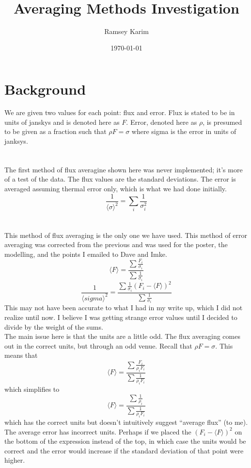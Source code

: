 \documentclass{article}
\title{Averaging Methods Investigation}
\author{Ramsey Karim}
\date{\today}
\newcommand{\av}[1]{\langle #1 \rangle}
\begin{document}
\maketitle

\section*{Background}
We are given two values for each point: flux and error.
Flux is stated to be in units of janskys and is denoted here as $F$.
Error, denoted here as $\rho$, is presumed to be given as a fraction such that
$\rho F = \sigma$ where sigma is the error in units of janksys.

\section{} \label{s:1}
The first method of flux averagine shown here was never implemented;
it's more of a test of the data.
The flux values are the standard deviations.
The error is averaged assuming thermal error only, which is what we had done initially.
$$ \frac{1}{\av{\sigma}^{2}} = \sum_{i} \frac{1}{\sigma_{i}^{2}} $$

\section{} \label{s:2}
This method of flux averaging is the only one we have used.
This method of error averaging was corrected from the previous and was used
for the poster, the modelling, and the points I emailed to Dave and Imke.
$$ \av{F} = \frac{\sum \frac{F_{i}}{\sigma_{i}}}{\sum \frac{1}{\sigma_{i}}} $$
$$ \frac{1}{\av{sigma}^{2}} =  \frac{\sum \frac{1}{\sigma_{i}} (F_{i} - \av{F})^{2} }{\sum \frac{1}{\sigma_{i}}} $$
This may not have been accurate to what I had in my write up, which I did not realize until now.
I believe I was getting strange error values until I decided to divide by the weight of the sums. \\
The main issue here is that the units are a little odd.
The flux averaging comes out in the correct units, but through an odd venue.
Recall that $\rho F = \sigma$.
This means that
$$ \av{F} = \frac{\sum \frac{F_{i}}{\rho_{i} F_{i}}}{\sum \frac{1}{\rho_{i} F_{i}}} $$
which simplifies to
$$ \av{F} = \frac{\sum \frac{1}{\rho_{i}}}{\sum \frac{1}{\rho_{i} F_{i}}} $$
which has the correct units but doesn't intuitively suggest ``average flux''
(to me). \\
The average error has incorrect units.
Perhaps if we placed the $(F_{i} - \av{F})^{2}$ on the bottom of the expression instead of the top,
in which case the units would be correct and the error would increase if the standard deviation of
that point were higher.
\end{document}

